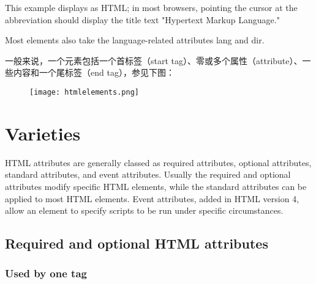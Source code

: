 This example displays as HTML; in most browsers, pointing the cursor at the abbreviation should display the title text "Hypertext Markup Language."


Most elements also take the language-related attributes lang and dir.





一般来说，一个元素包括一个首标签（start tag）、零或多个属性（attribute）、一些内容和一个尾标签（end tag），参见下图：

\begin{figure}[!h]
\centering
\texttt{[image: htmlelements.png]}
\end{figure}



\chapter{Varieties}


HTML attributes are generally classed as required attributes, optional attributes, standard attributes, and event attributes. Usually the required and optional attributes modify specific HTML elements, while the standard attributes can be applied to most HTML elements. Event attributes, added in HTML version 4, allow an element to specify scripts to be run under specific circumstances.



\section{Required and optional HTML attributes}


\subsection{Used by one tag}


